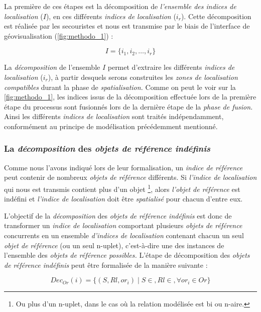 La première de ces étapes est la décomposition de \emph{l'ensemble des
  indices de localisation} (\(I\)), en ces différents \emph{indices de
  localisation} (\(i_r\)). Cette décomposition est réalisée par les
secouristes et nous est transmise par le biais de l'interface de
géovisualisation (\autoref{fig:methodo_1}) :

\begin{equation}
  \label{eq:ens_ind_loc}
  I = \{i_1, i_2, \dots, i_r \}
\end{equation}

La \emph{décomposition} de l'ensemble \(I\) permet d'extraire les
différents \emph{indices de localisation} (\(i_r\)), à partir desquels
serons construites les \emph{zones de localisation compatibles} durant
la phase de \emph{spatialisation.} Comme on peut le voir sur la
\autoref{fig:methodo_1}, les indices issus de la décomposition
effectuée lors de la première étape du processus sont fusionnés lors
de la dernière étape de la \emph{phase de fusion.} Ainsi les
différents \emph{indices de localisation} sont traités indépendamment,
conformément au principe de modélisation précédemment mentionné.

\subsubsection{La \emph{décomposition} des \emph{objets de référence indéfinis}}

Comme nous l'avons indiqué lors de leur formalisation, un \emph{indice
  de référence} peut contenir de nombreux \emph{objets de référence}
différents. Si \emph{l'indice de localisation} qui nous est transmis
contient plus d'un objet \footnote{Ou plus d'un n-uplet, dans le cas
  où la relation modélisée est bi ou n-aire.}, alors \emph{l'objet de
  référence} est indéfini et \emph{l'indice de localisation} doit être
\emph{spatialisé} pour chacun d'entre eux.

L'objectif de la \emph{décomposition} des \emph{objets de référence
  indéfinis} est donc de transformer un \emph{indice de localisation}
comportant plusieurs \emph{objets de référence} concurrents en un
ensemble \emph{d'indices de localisation} contenant chacun un seul
\emph{objet de référence} (ou un seul n-uplet), c'est-à-dire une des
instances de l'ensemble des \emph{objets de référence possibles.}
L'étape de décomposition des \emph{objets de référence indéfinis} peut
être formalisée de la manière suivante :

\begin{equation}
  Dec_{Or}(i) = \{(S,Rl,or_i) \mid S \in , Rl \in , \forall or_i \in Or \} 
\end{equation}

